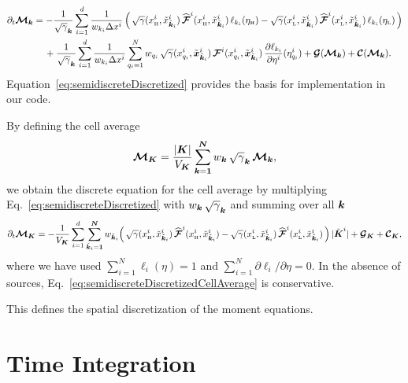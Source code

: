 \documentclass[10pt,preprint]{aastex}
\begin{document}
\begin{align}
  \partial_{t}{\boldsymbol{\mathcal{M}}_{\boldsymbol{k}}}
  &=
  -\frac{1}{\sqrt{\gamma}_{\boldsymbol{k}}}\sum_{i=1}^{d} 
  \frac{1}{w_{k_{i}}\Delta x^{i}}\,
  \Big(\,
    \sqrt{\gamma}(x_{\mbox{\tiny H}}^{i},\tilde{x}_{\tilde{\boldsymbol{k}}_{i}}^{i})\,\widehat{\boldsymbol{\mathcal{F}}}^{i}(x_{\mbox{\tiny H}}^{i},\tilde{x}_{\tilde{\boldsymbol{k}}_{i}}^{i})\,\ell_{k_{i}}(\eta_{\mbox{\tiny H}})
    -\sqrt{\gamma}(x_{\mbox{\tiny L}}^{i},\tilde{x}_{\tilde{\boldsymbol{k}}_{i}}^{i})\,\widehat{\boldsymbol{\mathcal{F}}}^{i}(x_{\mbox{\tiny L}}^{i},\tilde{x}_{\tilde{\boldsymbol{k}}_{i}}^{i})\,\ell_{k_{i}}(\eta_{\mbox{\tiny L}})
  \,\Big)
  \nonumber \\
  &\hspace{12pt}
  +\frac{1}{\sqrt{\gamma}_{\boldsymbol{k}}}\sum_{i=1}^{d}\frac{1}{w_{k_{i}}\Delta x^{i}}
  \sum_{q_{i}=1}^{N}w_{q_{i}}\,\sqrt{\gamma}(x_{q_{i}}^{i},\tilde{\boldsymbol{x}}_{\tilde{\boldsymbol{k}}_{i}}^{i})\,
  \boldsymbol{\mathcal{F}}^{i}(x_{q_{i}}^{i},\tilde{\boldsymbol{x}}_{\tilde{\boldsymbol{k}}_{i}}^{i})\,\frac{\partial \ell_{k_{i}}}{\partial \eta^{i}}(\eta_{q_{i}}^{i})
  +\boldsymbol{\mathcal{G}}(\boldsymbol{\mathcal{M}}_{\boldsymbol{k}})+\boldsymbol{\mathcal{C}}(\boldsymbol{\mathcal{M}}_{\boldsymbol{k}}).
  \label{eq:semidiscreteDiscretized}
\end{align}
Equation~\eqref{eq:semidiscreteDiscretized} provides the basis for implementation in our code.  

By defining the cell average
\begin{equation}
  \boldsymbol{\mathcal{M}}_{\boldsymbol{K}}=\frac{|\boldsymbol{K}|}{V_{\boldsymbol{K}}}\sum_{\boldsymbol{k}=\boldsymbol{1}}^{\boldsymbol{N}}w_{\boldsymbol{k}}\,\sqrt{\gamma}_{\boldsymbol{k}}\,\boldsymbol{\mathcal{M}}_{\boldsymbol{k}},
  \label{eq:conservedCellAverage}
\end{equation}
we obtain the discrete equation for the cell average by multiplying Eq.~\eqref{eq:semidiscreteDiscretized} with $w_{\boldsymbol{k}}\,\sqrt{\gamma}_{\boldsymbol{k}}$ and summing over all $\boldsymbol{k}$
\begin{equation}
  \partial_{t}{\boldsymbol{\mathcal{M}}_{\boldsymbol{K}}}
  =-\frac{1}{V_{\boldsymbol{K}}}\sum_{i=1}^{d}\sum_{\tilde{\boldsymbol{k}}_{i}=\boldsymbol{1}}^{\boldsymbol{N}}w_{\tilde{\boldsymbol{k}}_{i}}
  \Big(\,
    \sqrt{\gamma}(x_{\mbox{\tiny H}}^{i},\tilde{x}_{\tilde{\boldsymbol{k}}_{i}}^{i})\,\widehat{\boldsymbol{\mathcal{F}}}^{i}(x_{\mbox{\tiny H}}^{i},\tilde{x}_{\tilde{\boldsymbol{k}}_{i}}^{i})
    -\sqrt{\gamma}(x_{\mbox{\tiny L}}^{i},\tilde{x}_{\tilde{\boldsymbol{k}}_{i}}^{i})\,\widehat{\boldsymbol{\mathcal{F}}}^{i}(x_{\mbox{\tiny L}}^{i},\tilde{x}_{\tilde{\boldsymbol{k}}_{i}}^{i})
  \,\Big)\,|\tilde{\boldsymbol{K}}^{i}|
  +\boldsymbol{\mathcal{G}}_{\boldsymbol{K}}+\boldsymbol{\mathcal{C}}_{\boldsymbol{K}},
  \label{eq:semidiscreteDiscretizedCellAverage}
\end{equation}
where we have used $\sum_{i=1}^{N}\ell_{i}(\eta)=1$ and $\sum_{i=1}^{N}\partial\ell_{i}/\partial\eta=0$.  
In the absence of sources, Eq.~\eqref{eq:semidiscreteDiscretizedCellAverage} is conservative.  

This defines the spatial discretization of the moment equations.  

\clearpage

\section{Time Integration}
\end{document}
